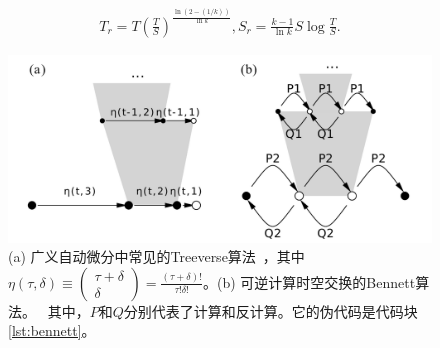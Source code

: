 \documentclass[A4,twoside,fontset=ubuntu,UTF8]{ctexart}
\begin{document}
\begin{align}\label{eq:rev}
    T_r = T\left(\frac{T}{S}\right)^{\frac{\ln(2-(1/k))}{\ln k}}, S_r = \frac{k-1}{\ln k}S\log\frac{T}{S}.
\end{align}

\begin{figure}
    \centerline{\includegraphics[width=0.88\columnwidth,trim={0 0cm 0 0cm},clip]{tradeoff.pdf}}
    \caption{(a) 广义自动微分中常见的Treeverse算法~\cite{Griewank1992}，其中$\eta(\tau, \delta) \equiv \left(\begin{matrix} \tau + \delta \\ \delta \end{matrix}\right)=\frac{(\tau+\delta)!}{\tau!\delta!}$。(b) 可逆计算时空交换的Bennett算法。~\cite{Bennett1973,Levine1990} 其中，$P$和$Q$分别代表了计算和反计算。它的伪代码是代码块\ref{lst:bennett}。}\label{fig:tradeoff}
\end{figure}
\end{document}
